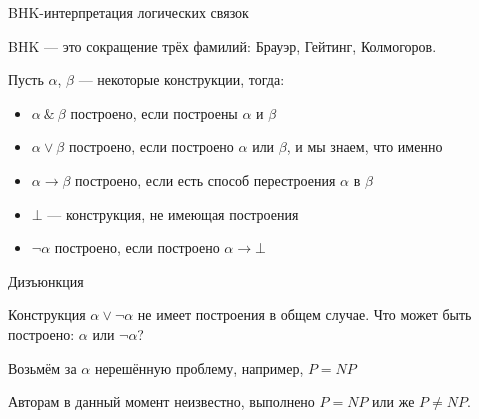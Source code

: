 \documentclass[aspectratio=169]{beamer}
\begin{document}
\begin{frame}{BHK-интерпретация логических связок}

BHK — это сокращение трёх фамилий: Брауэр, Гейтинг, Колмогоров. \pause

\vspace{1cm}

Пусть $\alpha$, $\beta$ --- некоторые конструкции, тогда:\pause

\begin{itemize}
\item $\alpha\ \&\ \beta$ построено, если построены $\alpha$ и $\beta$ \pause
\item $\alpha \vee \beta$ построено, если построено $\alpha$ или $\beta$,
и мы знаем, что именно \pause
\item $\alpha\rightarrow\beta$ построено, если есть способ перестроения
$\alpha$ в $\beta$\pause
\item $\bot$ — конструкция, не имеющая построения\pause
\item $\neg\alpha$ построено, если построено $\alpha\rightarrow\bot$
\end{itemize}
\end{frame}

\begin{frame}{Дизъюнкция}

Конструкция $\alpha\vee\neg\alpha$ не имеет построения в общем случае.
Что может быть построено: $\alpha$ или $\neg\alpha$?\pause

\vspace{1cm}

Возьмём за $\alpha$ нерешённую проблему, например, $P = NP$\pause
\vspace{1cm}

Авторам в данный момент неизвестно, выполнено $P = NP$ или же $P \ne NP$.
\end{frame}
\end{document}
